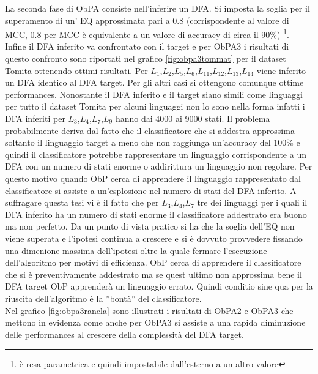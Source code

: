 La seconda fase di \ac{ObPA} consiste nell'inferire un \ac{DFA}. Si imposta la soglia per il superamento di un' \ac{EQ} approssimata pari a 0.8 (corrispondente al valore di MCC, 0.8 per MCC è equivalente a un valore di accuracy di circa il 90$\%$) \footnote{è resa parametrica e quindi impostabile dall'esterno a un altro valore}. Infine il \ac{DFA} inferito va confrontato con il target e per \ac{ObPA}3 i risultati di questo  confronto sono riportati nel grafico   \ref{fig:obpa3tommat} per il dataset Tomita  ottenendo ottimi risultati. Per $L_1$,$L_2$,$L_5$,$L_6$,$L_{11}$,$L_{12}$,$L_{13}$,$L_{14}$ viene inferito un \ac{DFA} identico al \ac{DFA} target. Per gli altri casi si ottengono comunque ottime performances. Nonostante il \ac{DFA} inferito e il target siano simili come linguaggi per tutto il dataset Tomita per alcuni linguaggi non lo sono nella forma infatti  i \ac{DFA} inferiti per $L_3$,$L_4$,$L_7$,$L_9$ hanno dai 4000 ai 9000 stati.  Il problema probabilmente deriva dal fatto che il classificatore che si addestra approssima soltanto il linguaggio target a meno che non raggiunga un'accuracy del $100\%$ e quindi il classificatore potrebbe rappresentare un linguaggio corrispondente a un \ac{DFA} con un numero di stati enorme o addirittura un linguaggio non regolare. Per questo motivo quando \ac{ObP} cerca di apprendere il linguaggio rappresentato dal classificatore si assiste a un'esplosione nel numero di stati del \ac{DFA} inferito. A suffragare questa tesi vi è il fatto che per $L_3$,$L_4$,$L_7$ tre dei linguaggi per i quali il \ac{DFA} inferito ha un numero di stati enorme il classificatore addestrato era buono ma non perfetto.  Da un punto di vista pratico si ha che la soglia dell'\ac{EQ} non viene superata e l'ipotesi continua a crescere e si è dovvuto provvedere fissando una dimenione massima dell'ipotesi oltre la quale fermare l'esecuzione dell'algoritmo per motivi di efficienza.   \ac{ObP} cerca di apprendere il classificatore che si è preventivamente addestrato ma se quest ultimo non approssima bene il \ac{DFA} target \ac{ObP} apprenderà un linguaggio errato. Quindi conditio sine qua per la riuscita dell'algoritmo è la ''bontà'' del classificatore.\\

Nel grafico \ref{fig:obpa3rancla} sono illustrati i risultati di \ac{ObPA}2 e \ac{ObPA}3 che mettono in evidenza come anche per \ac{ObPA}3 si assiste a una rapida diminuzione delle performances al crescere della complessità del \ac{DFA} target. 



